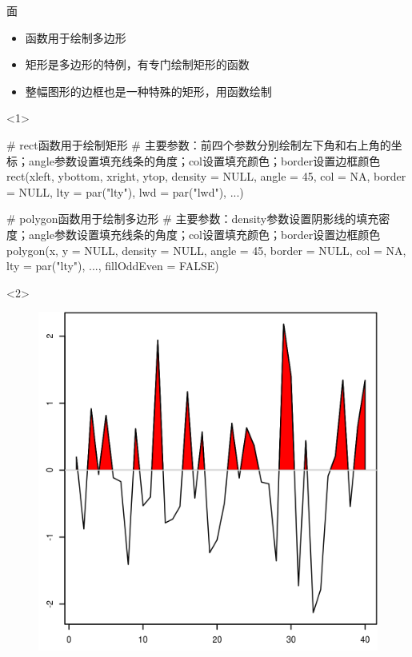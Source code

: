 \documentclass{beamerthemeMono}
\begin{document}
\begin{frame}[t,fragile]{\subsecname}{面}
\begin{itemize}
\item {}函数用于绘制多边形
\item 矩形是多边形的特例，有专门绘制矩形的函数
\item 整幅图形的边框也是一种特殊的矩形，用函数绘制
\end{itemize}

\begin{onlyenv}<1>
\begin{rcode}
# rect函数用于绘制矩形
# 主要参数：前四个参数分别绘制左下角和右上角的坐标；angle参数设置填充线条的角度；col设置填充颜色；border设置边框颜色
rect(xleft, ybottom, xright, ytop, density = NULL, angle = 45, col = NA, border = NULL, lty = par("lty"), lwd = par("lwd"), ...)
\end{rcode}
\begin{rcode}
# polygon函数用于绘制多边形
# 主要参数：density参数设置阴影线的填充密度；angle参数设置填充线条的角度；col设置填充颜色；border设置边框颜色
polygon(x, y = NULL, density = NULL, angle = 45, border = NULL, col = NA, lty = par("lty"), ..., fillOddEven = FALSE)
\end{rcode}
\end{onlyenv}

\begin{onlyenv}<2>
\begin{figure}
 \begin{columns}
    \begin{column}[c]{.4\textwidth}
        \includegraphics[width=\columnwidth]{polygon-example.png}
    \end{column}


\end{columns}
\end{figure}
\end{onlyenv}
\end{frame}
\end{document}
